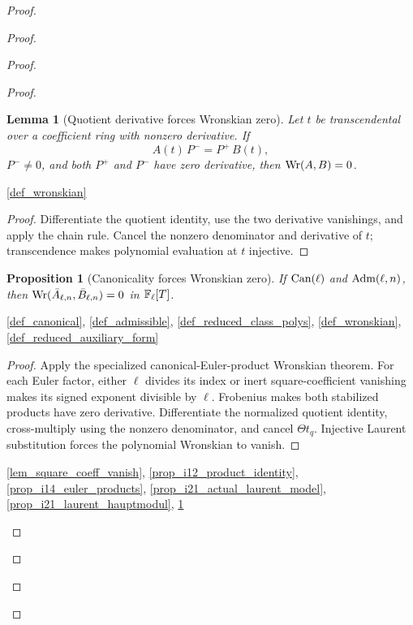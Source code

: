 \documentclass[11pt,a4paper]{article}
\numberwithin{equation}{section}
\theoremstyle{plain}\newtheorem{theorem}{Theorem}[section]\newaliascnt{proposition}{theorem}\newtheorem{proposition}[proposition]{Proposition}\aliascntresetthe{proposition}\newaliascnt{lemma}{theorem}\newtheorem{lemma}[lemma]{Lemma}\aliascntresetthe{lemma}
\theoremstyle{definition}\newaliascnt{definition}{theorem}\newtheorem{definition}[definition]{Definition}\aliascntresetthe{definition}\newaliascnt{notation}{theorem}\newtheorem{notation}[notation]{Notation}\aliascntresetthe{notation}
\providecommand{\lean}[1]{}\providecommand{\leanok}{}
\begin{document}
\begin{proof}
\begin{proof}
\begin{proof}
\begin{proof}
\begin{lemma}[Quotient derivative forces Wronskian zero]\label{lem_quotient_derivative_wronskian_zero}\lean{SptCM.wronskian_zero_of_borcherds_quotient}\leanok
Let $t$ be transcendental over a coefficient ring with nonzero derivative.
If
\[
  A(t)\,P^- = P^+\,B(t),
\]
$P^-\ne0$, and both $P^+$ and $P^-$ have zero derivative, then
$\operatorname{Wr}(A,B)=0$.
\end{lemma}
\begin{uses-statement}\ref{def_wronskian}\end{uses-statement}
\begin{proof}
Differentiate the quotient identity, use the two derivative vanishings, and
apply the chain rule.  Cancel the nonzero denominator and derivative of $t$;
transcendence makes polynomial evaluation at $t$ injective.
\end{proof}

\begin{proposition}[Canonicality forces Wronskian zero]\label{prop_W_zero}\lean{SptCM.Repair.actualClassPolynomials_wronskian_eq_zero}\leanok
If $\operatorname{Can}(\ell)$ and $\operatorname{Adm}(\ell,n)$, then $\operatorname{Wr}(\bar A_{\ell,n},\bar B_{\ell,n})=0$ in $\mathbb F_\ell[T]$.
\end{proposition}
\begin{uses-statement}\ref{def_canonical}, \ref{def_admissible}, \ref{def_reduced_class_polys}, \ref{def_wronskian}, \ref{def_reduced_auxiliary_form}\end{uses-statement}
\begin{proof}
Apply the specialized canonical-Euler-product Wronskian theorem.  For each Euler factor, either $\ell$ divides its index or inert square-coefficient vanishing makes its signed exponent divisible by $\ell$.  Frobenius makes both stabilized products have zero derivative.  Differentiate the normalized quotient identity, cross-multiply using the nonzero denominator, and cancel $\Theta t_q$.  Injective Laurent substitution forces the polynomial Wronskian to vanish.
\end{proof}
\begin{uses-proof}\ref{lem_square_coeff_vanish}, \ref{prop_i12_product_identity}, \ref{prop_i14_euler_products}, \ref{prop_i21_actual_laurent_model}, \ref{prop_i21_laurent_hauptmodul}, \ref{lem_quotient_derivative_wronskian_zero}\end{uses-proof}



\end{proof}
\end{proof}
\end{proof}
\end{proof}
\end{document}
